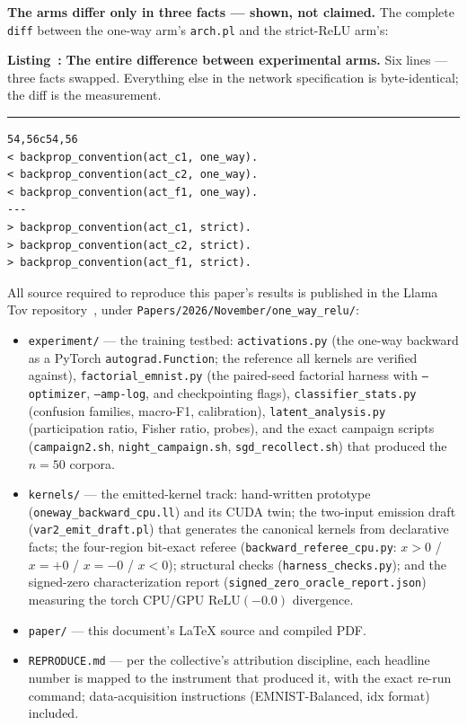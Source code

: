 \documentclass[11pt]{article}
\newcounter{lstcounter}
\renewcommand{\thelstcounter}{\arabic{lstcounter}}
\newenvironment{codelisting}[2]{%
  \refstepcounter{lstcounter}#1%
  \par\vspace{0.8\baselineskip}%
  \begin{mdframed}[nobreak=true,
     innerleftmargin=0.5em, innerrightmargin=0.5em,
     innertopmargin=0.5em, innerbottommargin=0.5em,
     skipabove=0.5\baselineskip, skipbelow=0.5\baselineskip,
     linewidth=0.4pt]%
  {\textbf{Listing~\thelstcounter:} #2\par}%
  \vspace{-6pt}\noindent\rule{\linewidth}{0.4pt}\par
  \vspace{-4pt}\small}{%
  \end{mdframed}}
\newcommand{\relu}{\mathrm{ReLU}}
\begin{document}
\noindent\textbf{The arms differ only in three facts --- shown, not
claimed.} The complete \texttt{diff} between the one-way arm's
\texttt{arch.pl} and the strict-ReLU arm's:

\begin{codelisting}{\label{lst:armdiff}}{\textbf{The entire
difference between experimental arms.} Six lines --- three facts
swapped. Everything else in the network specification is
byte-identical; the diff is the measurement.}
\begin{Verbatim}
54,56c54,56
< backprop_convention(act_c1, one_way).
< backprop_convention(act_c2, one_way).
< backprop_convention(act_f1, one_way).
---
> backprop_convention(act_c1, strict).
> backprop_convention(act_c2, strict).
> backprop_convention(act_f1, strict).
\end{Verbatim}
\end{codelisting}

All source required to reproduce this paper's results is published in
the Llama Tov repository~\cite{llamatov2026}, under
\texttt{Papers/2026/November/one\_way\_relu/}:

\begin{itemize}
\item \texttt{experiment/} --- the training testbed:
  \texttt{activations.py} (the one-way backward as a PyTorch
  \texttt{autograd.Function}; the reference all kernels are verified
  against), \texttt{factorial\_emnist.py} (the paired-seed factorial
  harness with \texttt{--optimizer}, \texttt{--amp-log}, and
  checkpointing flags), \texttt{classifier\_stats.py} (confusion
  families, macro-F1, calibration), \texttt{latent\_analysis.py}
  (participation ratio, Fisher ratio, probes), and the exact campaign
  scripts (\texttt{campaign2.sh}, \texttt{night\_campaign.sh},
  \texttt{sgd\_recollect.sh}) that produced the $n{=}50$ corpora.
\item \texttt{kernels/} --- the emitted-kernel track:
  hand-written prototype (\texttt{oneway\_backward\_cpu.ll}) and its
  CUDA twin; the two-input emission draft
  (\texttt{var2\_emit\_draft.pl}) that generates the canonical
  kernels from declarative facts; the four-region bit-exact referee
  (\texttt{backward\_referee\_cpu.py}: $x{>}0$ / $x{=}{+}0$ /
  $x{=}{-}0$ / $x{<}0$); structural checks
  (\texttt{harness\_checks.py}); and the signed-zero
  characterization report
  (\texttt{signed\_zero\_oracle\_report.json}) measuring the torch
  CPU/GPU $\relu(-0.0)$ divergence.
\item \texttt{paper/} --- this document's \LaTeX{} source and
  compiled PDF.
\item \texttt{REPRODUCE.md} --- per the collective's attribution
  discipline, each headline number is mapped to the instrument that
  produced it, with the exact re-run command; data-acquisition
  instructions (EMNIST-Balanced, idx format) included.
\end{itemize}
\end{document}

